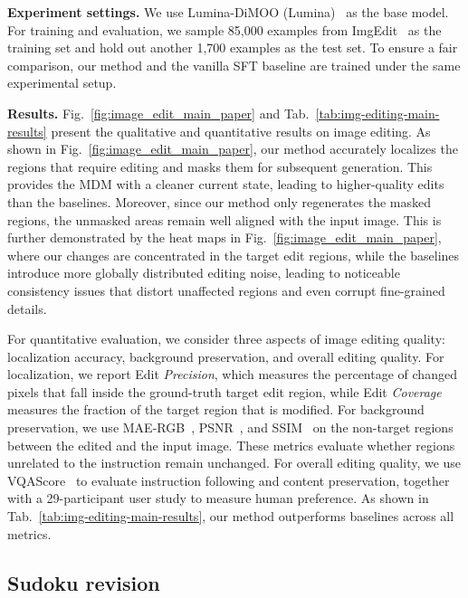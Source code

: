 \textbf{Experiment settings.}
We use Lumina-DiMOO (Lumina)~\citep{xin2025lumina} as the base model. For training and evaluation, we sample 85,000 examples from ImgEdit~\citep{ye2025imgedit} as the training set and hold out another 1,700 examples as the test set. To ensure a fair comparison, our method and the vanilla SFT baseline are trained under the same experimental setup.







\textbf{Results.}
Fig.~\ref{fig:image_edit_main_paper} and Tab.~\ref{tab:img-editing-main-results} present the qualitative and quantitative results on image editing.
As shown in Fig.~\ref{fig:image_edit_main_paper}, our method accurately localizes the regions that require editing and masks them for subsequent generation.
This provides the MDM with a cleaner current state, leading to higher-quality edits than the baselines.
Moreover, since our method only regenerates the masked regions, the unmasked areas remain well aligned with the input image.
This is further demonstrated by the heat maps in Fig.~\ref{fig:image_edit_main_paper}, where our changes are concentrated in the target edit regions, while the baselines introduce more globally distributed editing noise, leading to noticeable consistency issues that distort unaffected regions and even corrupt fine-grained details.

For quantitative evaluation, we consider three aspects of image editing quality: localization accuracy, background preservation, and overall editing quality.
For localization, we report Edit \textit{Precision}, which measures the percentage of changed pixels that fall inside the ground-truth target edit region, while Edit \textit{Coverage} measures the fraction of the target region that is modified.
For background preservation, we use MAE-RGB~\citep{willmott2005advantages}, PSNR~\citep{huynh2008scope}, and SSIM~\citep{wang2004image} on the non-target regions between the edited and the input image.
These metrics evaluate whether regions unrelated to the instruction remain unchanged.
For overall editing quality, we use VQAScore~\citep{lin2024evaluating} to evaluate instruction following and content preservation, together with a 29-participant user study to measure human preference.
As shown in Tab.~\ref{tab:img-editing-main-results}, our method outperforms baselines across all metrics.


\subsection{Sudoku revision}
\label{sec:sudoku-experiments}

